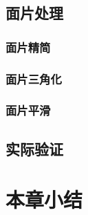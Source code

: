 \subsection{面片处理}

\subsubsection{面片精简}

\subsubsection{面片三角化}

\subsubsection{面片平滑}

\subsection{实际验证}


\section{本章小结} 